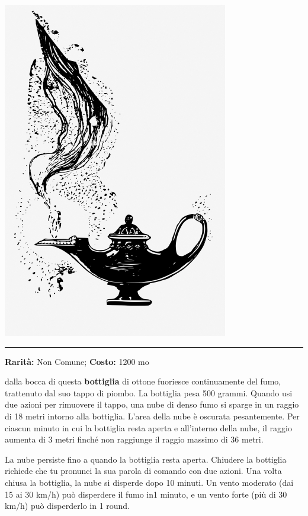 \begin{multicols}{2}
\begin{center}
	\includegraphics[width=0.7\linewidth]{immagini/genielamp.png}
\end{center}

\smallskip\noindent\rule{\linewidth}{2pt}  \hypertarget{BottigliaFumante}{}\smallskip{}\noindent\label{BottigliaFumante}

\textbf{Rarità:} Non Comune; \textbf{Costo:} 1200 mo

dalla bocca di questa \textbf{bottiglia} di ottone fuoriesce continuamente del fumo, trattenuto dal suo tappo di piombo. La bottiglia pesa 500 grammi. Quando usi due azioni per rimuovere il tappo, una nube di denso fumo si sparge in un raggio di 18 metri intorno alla bottiglia. L'area della nube è oscurata pesantemente. Per ciascun minuto in cui la bottiglia resta aperta e all'interno della nube, il raggio aumenta di 3 metri finché non raggiunge il raggio massimo di 36 metri.

La nube persiste fino a quando la bottiglia resta aperta. Chiudere la bottiglia richiede che tu pronunci la sua parola di comando con due azioni. Una volta chiusa la bottiglia, la nube si disperde dopo 10 minuti. Un vento moderato (dai 15 ai 30 km/h) può disperdere il fumo in1 minuto, e un vento forte (più di 30 km/h) può disperderlo in 1 round.


\end{multicols}
